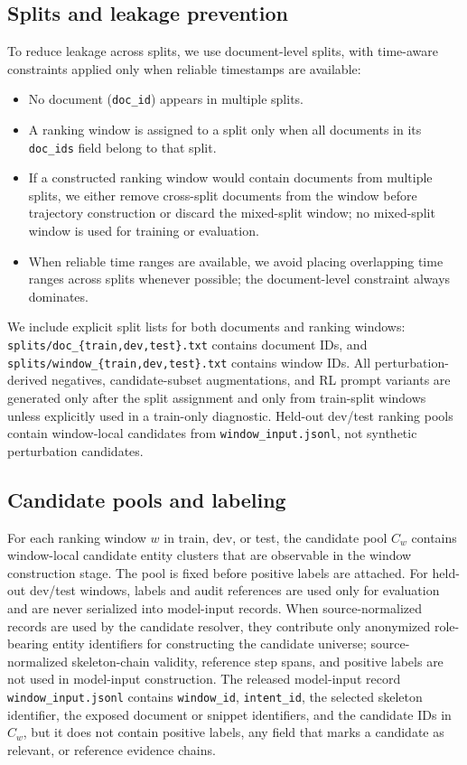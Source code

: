 \documentclass{article}
\begin{document}
\subsection{Splits and leakage prevention}
\label{sec:app_data_splits}

To reduce leakage across splits, we use document-level splits, with time-aware constraints applied only when reliable timestamps are available:
\begin{itemize}
    \item No document (\texttt{doc\_id}) appears in multiple splits.
    \item A ranking window is assigned to a split only when all documents in its \texttt{doc\_ids} field belong to that split.
    \item If a constructed ranking window would contain documents from multiple splits, we either remove cross-split documents from the window before trajectory construction or discard the mixed-split window; no mixed-split window is used for training or evaluation.
    \item When reliable time ranges are available, we avoid placing overlapping time ranges across splits whenever possible; the document-level constraint always dominates.
\end{itemize}
We include explicit split lists for both documents and ranking windows:
\texttt{splits/doc\_\{train,dev,test\}.txt} contains document IDs, and
\texttt{splits/window\_\{train,dev,test\}.txt} contains window IDs.
All perturbation-derived negatives, candidate-subset augmentations, and RL prompt variants are generated only after the split assignment and only from train-split windows unless explicitly used in a train-only diagnostic.
Held-out dev/test ranking pools contain window-local candidates from \texttt{window\_input.jsonl}, not synthetic perturbation candidates.

\subsection{Candidate pools and labeling}
\label{sec:app_data_labeling}

For each ranking window $w$ in train, dev, or test, the candidate pool $C_w$ contains window-local candidate entity clusters that are observable in the window construction stage.
The pool is fixed before positive labels are attached.
For held-out dev/test windows, labels and audit references are used only for evaluation and are never serialized into model-input records.
When source-normalized records are used by the candidate resolver, they contribute only anonymized role-bearing entity identifiers for constructing the candidate universe; source-normalized skeleton-chain validity, reference step spans, and positive labels are not used in model-input construction.
The released model-input record \texttt{window\_input.jsonl} contains \texttt{window\_id}, \texttt{intent\_id}, the selected skeleton identifier, the exposed document or snippet identifiers, and the candidate IDs in $C_w$, but it does not contain positive labels, any field that marks a candidate as relevant, or reference evidence chains.
\end{document}
